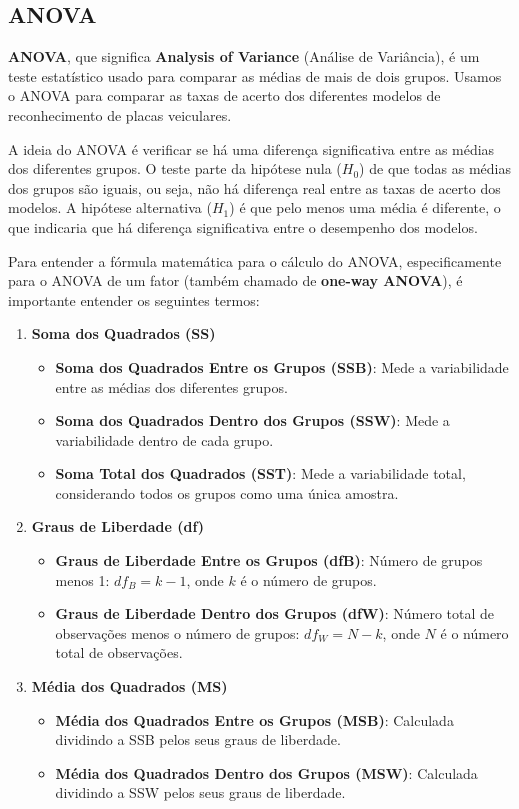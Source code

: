 \documentclass[conference]{IEEEtran}
\begin{document}
\subsection{ANOVA}

\textbf{ANOVA}, que significa \textbf{Analysis of Variance} (Análise de Variância), é um teste estatístico usado para comparar as médias de mais de dois grupos. Usamos o ANOVA para comparar as taxas de acerto dos diferentes modelos de reconhecimento de placas veiculares.

A ideia do ANOVA é verificar se há uma diferença significativa entre as médias dos diferentes grupos. O teste parte da hipótese nula ($H_0$) de que todas as médias dos grupos são iguais, ou seja, não há diferença real entre as taxas de acerto dos modelos. A hipótese alternativa ($H_1$) é que pelo menos uma média é diferente, o que indicaria que há diferença significativa entre o desempenho dos modelos.

Para entender a fórmula matemática para o cálculo do ANOVA, especificamente para o ANOVA de um fator (também chamado de \textbf{one-way ANOVA}), é importante entender os seguintes termos:

\begin{enumerate}
    \item \textbf{Soma dos Quadrados (SS)}
        \begin{itemize}
            \item \textbf{Soma dos Quadrados Entre os Grupos (SSB)}: Mede a variabilidade entre as médias dos diferentes grupos.
            \item \textbf{Soma dos Quadrados Dentro dos Grupos (SSW)}: Mede a variabilidade dentro de cada grupo.
            \item \textbf{Soma Total dos Quadrados (SST)}: Mede a variabilidade total, considerando todos os grupos como uma única amostra.
        \end{itemize}
    \item \textbf{Graus de Liberdade (df)}
         \begin{itemize}
            \item \textbf{Graus de Liberdade Entre os Grupos (dfB)}: Número de grupos menos 1: \( df_B = k - 1 \), onde \( k \) é o número de grupos.
            \item \textbf{Graus de Liberdade Dentro dos Grupos (dfW)}: Número total de observações menos o número de grupos: \( df_W = N - k \), onde \( N \) é o número total de observações.
        \end{itemize}
    \item \textbf{Média dos Quadrados (MS)}
         \begin{itemize}
            \item \textbf{Média dos Quadrados Entre os Grupos (MSB)}: Calculada dividindo a SSB pelos seus graus de liberdade.
            \item \textbf{Média dos Quadrados Dentro dos Grupos (MSW)}: Calculada dividindo a SSW pelos seus graus de liberdade.
        \end{itemize}
\end{enumerate}
\end{document}

